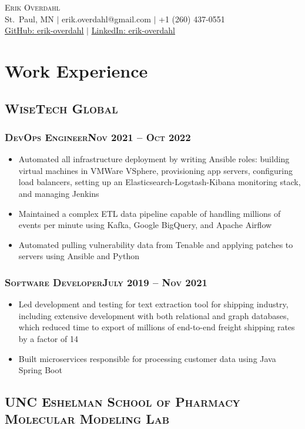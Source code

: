 \documentclass{article}
\newcommand{\resumeSection}[1]{\section*{#1}}
\newcommand{\institution}[1]{\subsection*{\scshape{#1}}}
\newcommand{\jobPosition}[3]{\subsubsection*{\scshape{#1}\hfill #2 -- #3}}
\begin{document}
\begin{center}
  {\Huge\scshape{Erik Overdahl}}
  \\\vspace{3pt}
  \normalsize{
    St.\ Paul, MN
    $|$
    erik.overdahl@gmail.com
    $|$
    +1 (260) 437-0551
    \\
    \href{https://github.com/erik-overdahl}{GitHub: \underline{erik-overdahl}}
    $|$
    \href{https://linkedin.com/in/erik-overdahl}{LinkedIn: \underline{erik-overdahl}}
  }
\end{center}

\resumeSection{Work Experience}

  \institution{WiseTech Global}

    \jobPosition{DevOps Engineer}{Nov 2021}{Oct 2022}
    \begin{itemize}
      \item
            Automated all infrastructure deployment by writing Ansible
            roles: building virtual machines in VMWare VSphere,
            provisioning app servers, configuring load balancers, setting
            up an Elasticsearch-Logstash-Kibana monitoring stack, and
            managing Jenkins
      \item
            Maintained a complex ETL data pipeline capable of handling
            millions of events per minute using Kafka, Google BigQuery,
            and Apache Airflow
      \item
            Automated pulling vulnerability data from Tenable and
            applying patches to servers using Ansible and Python
    \end{itemize}

    \jobPosition{Software Developer}{July 2019}{Nov 2021}
    \begin{itemize}
      \item
            Led development and testing for text extraction tool for
            shipping industry, including extensive development with
            both relational and graph databases, which reduced time to
            export of millions of end-to-end freight shipping rates by
            a factor of 14
      \item
            Built microservices responsible for processing customer
            data using Java Spring Boot
    \end{itemize}

  \institution{UNC Eshelman School of Pharmacy Molecular Modeling Lab}
\end{document}
